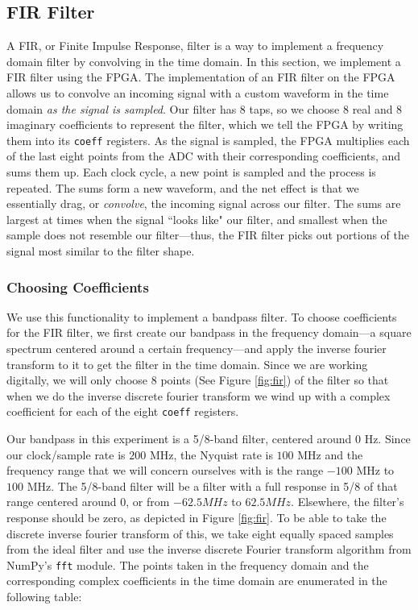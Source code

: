 \documentclass[12pt]{article}
\begin{document}
\subsection{FIR Filter}
A FIR, or Finite Impulse Response, filter is a way to implement a frequency domain filter by convolving in the time domain. In this section, we implement a FIR filter using the FPGA. The implementation of an FIR filter on the FPGA allows us to convolve an incoming signal with a custom waveform in the time domain \textit{as the signal is sampled}. Our filter has 8 taps, so we choose 8 real and 8 imaginary coefficients to represent the filter, which we tell the FPGA by writing them into its \texttt{coeff} registers. As the signal is sampled, the FPGA multiplies each of the last eight points from the ADC with their corresponding coefficients, and sums them up. Each clock cycle, a new point is sampled and the process is repeated. The sums form a new waveform, and the net effect is that we  essentially drag, or \textit{convolve}, the incoming signal across our filter. The sums are largest at times when the signal ``looks like" our filter, and smallest when the sample does not resemble our filter---thus, the FIR filter picks out portions of the signal most similar to the filter shape.

\subsubsection{Choosing Coefficients}
We use this functionality to implement a bandpass filter. To choose coefficients for the FIR filter, we first create our bandpass in the frequency domain---a square spectrum centered around a certain frequency---and apply the inverse fourier transform to it to get the filter in the time domain. Since we are working digitally, we will only choose 8 points (See Figure \ref{fig:fir}) of the filter so that when we do the inverse discrete fourier transform we wind up with a complex coefficient for each of the eight \texttt{coeff} registers.

Our bandpass in this experiment is a 5/8-band filter, centered around $0$ Hz. Since our clock/sample rate is $200$ MHz, the Nyquist rate is $100$ MHz and the frequency range that we will concern ourselves with is the range $-100$ MHz to $100$ MHz. The 5/8-band filter will be a filter with a full response in 5/8 of that range centered around 0, or from $-62.5MHz$ to $62.5 MHz$. Elsewhere, the filter's response should be zero, as depicted in Figure \ref{fig:fir}. To be able to take the discrete inverse fourier transform of this, we take eight equally spaced samples from the ideal filter and use the inverse discrete Fourier transform algorithm from NumPy's \texttt{fft} module. The points taken in the frequency domain and the corresponding complex coefficients in the time domain are enumerated in the following table:
\end{document}

